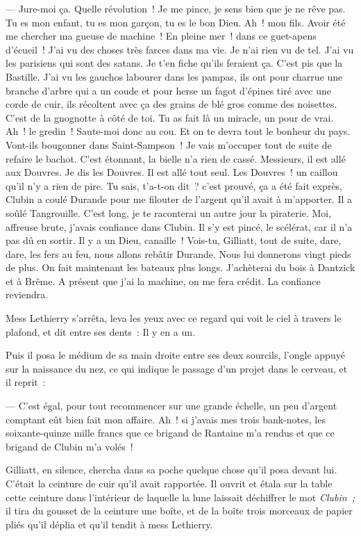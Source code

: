 \documentclass[french,twoside]{book} %
\begin{document}
— Jure-moi ça. Quelle révolution ! Je me pince, je sens bien que je ne rêve pas. Tu es mon enfant, tu es mon garçon, tu es le bon Dieu. Ah ! mon fils. Avoir été me chercher ma gueuse de machine ! En pleine mer ! dans ce guet-apens d’écueil ! J’ai vu des choses très farces dans ma vie. Je n’ai rien vu de tel. J’ai vu les parisiens qui sont des satans. Je t’en fiche qu’ils feraient ça. C’est pis que la Bastille. J’ai vu les gauchos  labourer dans les pampas, ils ont pour charrue une branche d’arbre qui a un coude et pour herse un fagot d’épines tiré avec une corde de cuir, ils récoltent avec ça des grains de blé gros comme des noisettes. C’est de la gnognotte à côté de toi. Tu as fait là un miracle, un pour de vrai. Ah ! le gredin ! Saute-moi donc au cou. Et on te devra tout le bonheur du pays. Vont-ils bougonner dans Saint-Sampson ! Je vais m’occuper tout de suite de refaire le bachot. C’est étonnant, la bielle n’a rien de cassé. Messieurs, il est allé aux Douvres. Je dis les Douvres. Il est allé tout seul. Les Douvres ! un caillou qu’il n’y a rien de pire. Tu sais, t’a-t-on dit ? c’est prouvé, ça a été fait exprès, Clubin a coulé Durande pour me filouter de l’argent qu’il avait à m’apporter. Il a soûlé Tangrouille. C’est long, je te raconterai un autre jour la piraterie. Moi, affreuse brute, j’avais confiance dans Clubin. Il s’y est pincé, le scélérat, car il n’a pas dû en sortir. Il y a un Dieu, canaille ! Vois-tu, Gilliatt, tout de suite, dare, dare, les fers au feu, nous allons rebâtir Durande. Nous lui donnerons vingt pieds de plus. On fait maintenant les bateaux plus longs. J’achèterai du bois à Dantzick et à Brême. A présent que j’ai la machine, on me fera crédit. La confiance reviendra.\par
Mess Lethierry s’arrêta, leva les yeux avec ce regard qui voit le ciel à travers le plafond, et dit entre ses dents : Il y en a un.\par
Puis il posa le médium de sa main droite entre ses deux sourcils, l’ongle appuyé sur la naissance du nez,  ce qui indique le passage d’un projet dans le cerveau, et il reprit :\par
— C’est égal, pour tout recommencer sur une grande échelle, un peu d’argent comptant eût bien fait mon affaire. Ah ! si j’avais mes trois bank-notes, les soixante-quinze mille francs que ce brigand de Rantaine m’a rendus et que ce brigand de Clubin m’a volés !\par
Gilliatt, en silence, chercha dans sa poche quelque chose qu’il posa devant lui. C’était la ceinture de cuir qu’il avait rapportée. Il ouvrit et étala sur la table cette ceinture dans l’intérieur de laquelle la lune laissait déchiffrer le mot \emph{Clubin ;} il tira du gousset de la ceinture une boîte, et de la boîte trois morceaux de papier pliés qu’il déplia et qu’il tendit à mess Lethierry.\par
\end{document}
